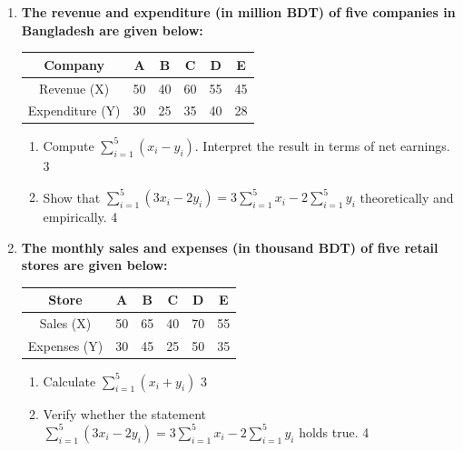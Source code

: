 \documentclass[a4paper,oneside]{book}
\begin{document}
\begin{enumerate}
  \begin{enumerate}
    \item
	What is finite population? \hfill 1
    \item
	What are the functions of statistics? \hfill 2
    \item  
	Find the value of $\displaystyle \sum_{i=1}^5 \sum_{j=1}^5 (x_i - y_j)$ \hfill 3
    \item
	Analyze the statement theoretically and empirically:  $\displaystyle \sum_{i=1}^5 (4x_i-6y_j) = 4 \sum_{i=1}^5 x_i - 6 \sum_{i=1}^5 y_j $ \hfill 4
  \end{enumerate}
  
  \item  
	  \textbf{The revenue and expenditure (in million BDT) of five companies in Bangladesh are given below:}  
	  
	  \begin{table}[h]
	  \centering
\begin{tabular}{c|ccccc}
Company & A & B & C & D & E \\ \hline
Revenue (X) & 50 & 40 & 60 & 55 & 45 \\ \hline
Expenditure (Y) & 30 & 25 & 35 & 40 & 28
\end{tabular}
\end{table}
  
  \begin{enumerate}
    \item  
	Compute $\displaystyle \sum_{i=1}^5 (x_i - y_i)$. Interpret the result in terms of net earnings. \hfill 3  
    \item  
	Show that $\displaystyle \sum_{i=1}^5 (3x_i - 2y_i) = 3 \sum_{i=1}^5 x_i - 2 \sum_{i=1}^5 y_i$ theoretically and empirically. \hfill 4  
  \end{enumerate}  

  
  \item
\textbf{The monthly sales and expenses (in thousand BDT) of five retail stores are given below:}

\begin{table}[h]
\centering
\begin{tabular}{c|ccccc}
Store & A & B & C & D & E \\ \hline
Sales (X) & 50 & 65 & 40 & 70 & 55 \\ \hline
Expenses (Y) & 30 & 45 & 25 & 50 & 35
\end{tabular}
\end{table}

\begin{enumerate}
    \item 
    Calculate $\displaystyle \sum_{i=1}^5 (x_i + y_i)$ \hfill 3
    \item 
    Verify whether the statement $\displaystyle \sum_{i=1}^5 (3x_i - 2y_i) = 3 \sum_{i=1}^5 x_i - 2 \sum_{i=1}^5 y_i$ holds true. \hfill 4
\end{enumerate}



\end{enumerate}
\end{document}
